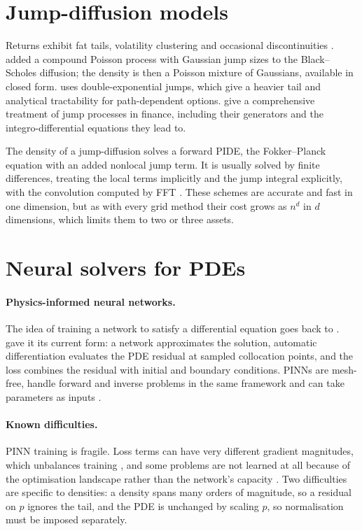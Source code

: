 \section{Jump-diffusion models}
\label{sec:lit-jumps}

Returns exhibit fat tails, volatility clustering and occasional discontinuities \citep{mandelbrot1963,cont2001}.
 added a compound Poisson process with Gaussian jump sizes to the Black--Scholes diffusion; the
density is then a Poisson mixture of Gaussians, available in closed form.  uses double-exponential
jumps, which give a heavier tail and analytical tractability for path-dependent options.  give a
comprehensive treatment of jump processes in finance, including their generators and the integro-differential
equations they lead to.

The density of a jump-diffusion solves a forward PIDE, the Fokker--Planck equation with an added nonlocal jump
term. It is usually solved by finite differences, treating the local terms implicitly and the jump integral
explicitly, with the convolution computed by FFT \citep{andersen2000,cont2004}. These schemes are accurate and fast
in one dimension, but as with every grid method their cost grows as $n^d$ in $d$ dimensions, which limits them to
two or three assets.

\section{Neural solvers for PDEs}
\label{sec:lit-pinn}

\paragraph{Physics-informed neural networks.} The idea of training a network to satisfy a differential equation
goes back to \citet{lagaris1998}.  gave it its current form: a network approximates the solution,
automatic differentiation evaluates the PDE residual at sampled collocation points, and the loss combines the
residual with initial and boundary conditions. PINNs are mesh-free, handle forward and inverse problems in the
same framework and can take parameters as inputs \citep{karniadakis2021}.

\paragraph{Known difficulties.} PINN training is fragile. Loss terms can have very different gradient magnitudes,
which unbalances training \citep{wang2021}, and some problems are not learned at all because of the optimisation
landscape rather than the network's capacity \citep{krishnapriyan2021}. Two difficulties are specific to densities:
a density spans many orders of magnitude, so a residual on $p$ ignores the tail, and the PDE is unchanged by
scaling $p$, so normalisation must be imposed separately.

